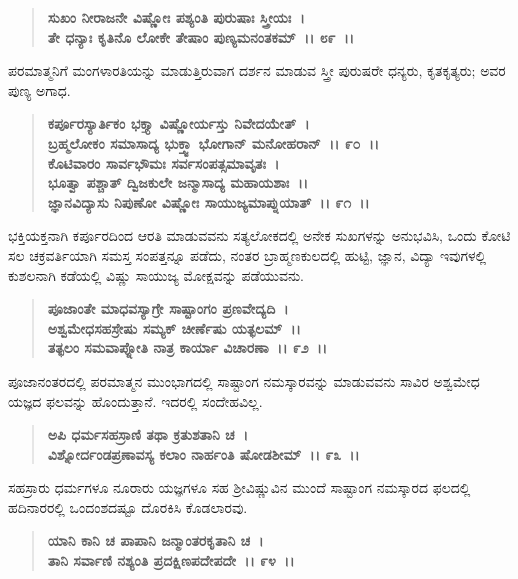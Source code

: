 \begin{verse}
\textbf{ಸುಖಂ ನೀರಾಜನೇ ವಿಷ್ಣೋಃ ಪಶ್ಯಂತಿ ಪುರುಷಾಃ ಸ್ತ್ರೀಯಃ~।}\\\textbf{ತೇ ಧನ್ಯಾಃ ಕೃತಿನೊ ಲೋಕೇ ತೇಷಾಂ ಪುಣ್ಯಮನಂತಕಮ್~।। ೮೯~।।}
\end{verse}

ಪರಮಾತ್ಮನಿಗೆ ಮಂಗಳಾರತಿಯನ್ನು ಮಾಡುತ್ತಿರುವಾಗ ದರ್ಶನ ಮಾಡುವ ಸ್ತ್ರೀ ಪುರುಷರೇ ಧನ್ಯರು, ಕೃತಕೃತ್ಯರು; ಅವರ ಪುಣ್ಯ ಅಗಾಧ.

\begin{verse}
\textbf{ಕರ್ಪೂರಸ್ಯಾರ್ತಿಕಂ ಭಕ್ತ್ಯಾ ವಿಷ್ಣೋರ್ಯಸ್ತು ನಿವೇದಯೇತ್~।}\\\textbf{ಬ್ರಹ್ಮಲೋಕಂ ಸಮಾಸಾದ್ಯ ಭುಕ್ತ್ವಾ ಭೋಗಾನ್ ಮನೋಹರಾನ್~।। ೯೦~।। }\\\textbf{ಕೊಟಿವಾರಂ ಸಾರ್ವಭೌಮಃ ಸರ್ವಸಂಪತ್ಸಮಾವೃತಃ~।}\\\textbf{ಭೂತ್ವಾ ಪಶ್ಚಾತ್ ದ್ವಿಜಕುಲೇ ಜನ್ಮಾಸಾದ್ಯ ಮಹಾಯಶಾಃ~।।} \\\textbf{ಜ್ಞಾನವಿದ್ಯಾಸು ನಿಪುಣೋ ವಿಷ್ಣೋಃ ಸಾಯುಜ್ಯಮಾಪ್ನುಯಾತ್~।। ೯೧~।।}
\end{verse}

ಭಕ್ತಿಯಕ್ತನಾಗಿ ಕರ್ಪೂರದಿಂದ ಆರತಿ ಮಾಡುವವನು ಸತ್ಯಲೋಕದಲ್ಲಿ ಅನೇಕ ಸುಖಗಳನ್ನು ಅನುಭವಿಸಿ, ಒಂದು ಕೋಟಿ ಸಲ ಚಕ್ರವರ್ತಿಯಾಗಿ ಸಮಸ್ತ ಸಂಪತ್ತನ್ನೂ ಪಡೆದು, ನಂತರ ಬ್ರಾಹ್ಮಣಕುಲದಲ್ಲಿ ಹುಟ್ಟಿ, ಜ್ಞಾನ, ವಿದ್ಯಾ ಇವುಗಳಲ್ಲಿ ಕುಶಲನಾಗಿ ಕಡೆಯಲ್ಲಿ ವಿಷ್ಣು ಸಾಯುಜ್ಯ ಮೋಕ್ಷವನ್ನು ಪಡೆಯುವನು.

\begin{verse}
\textbf{ಪೂಜಾಂತೇ ಮಾಧವಸ್ಯಾಗ್ರೇ ಸಾಷ್ಟಾಂಗಂ ಪ್ರಣವೇದ್ಯದಿ~।}\\\textbf{ಅಶ್ವಮೇಧಸಹಸ್ರೇಷು ಸಮ್ಯಕ್ ಚೀರ್ಣೆಷು ಯತ್ಫಲಮ್~।।}\\\textbf{ತತ್ಫಲಂ ಸಮವಾಪ್ನೋತಿ ನಾತ್ರ ಕಾರ್ಯಾ ವಿಚಾರಣಾ~।। ೯೨~।।}
\end{verse}

ಪೂಜಾನಂತರದಲ್ಲಿ ಪರಮಾತ್ಮನ ಮುಂಭಾಗದಲ್ಲಿ ಸಾಷ್ಟಾಂಗ ನಮಸ್ಕಾರವನ್ನು ಮಾಡುವವನು ಸಾವಿರ ಅಶ್ವಮೇಧ ಯಜ್ಞದ ಫಲವನ್ನು ಹೊಂದುತ್ತಾನೆ. ಇದರಲ್ಲಿ ಸಂದೇಹವಿಲ್ಲ.

\begin{verse}
\textbf{ಅಪಿ ಧರ್ಮಸಹಸ್ರಾಣಿ ತಥಾ ಕ್ರತುಶತಾನಿ ಚ~।}\\\textbf{ವಿಶ್ನೋರ್ದಂಡಪ್ರಣಾವಸ್ಯ ಕಲಾಂ ನಾರ್ಹಂತಿ ಷೋಡಶೀಮ್~।। ೯೩~।।}
\end{verse}

ಸಹಸ್ರಾರು ಧರ್ಮಗಳೂ ನೂರಾರು ಯಜ್ಞಗಳೂ ಸಹ ಶ‍್ರೀವಿಷ್ಣುವಿನ ಮುಂದೆ ಸಾಷ್ಟಾಂಗ ನಮಸ್ಕಾರದ ಫಲದಲ್ಲಿ ಹದಿನಾರರಲ್ಲಿ ಒಂದಂಶದಷ್ಟೂ ದೊರಕಿಸಿ ಕೊಡಲಾರವು.

\begin{verse}
\textbf{ಯಾನಿ ಕಾನಿ ಚ ಪಾಪಾನಿ ಜನ್ಮಾಂತರಕೃತಾನಿ ಚ~।}\\\textbf{ತಾನಿ ಸರ್ವಾಣಿ ನಶ್ಯಂತಿ ಪ್ರದಕ್ಷಿಣಪದೇಪದೇ~।। ೯೪~।। }
\end{verse}

